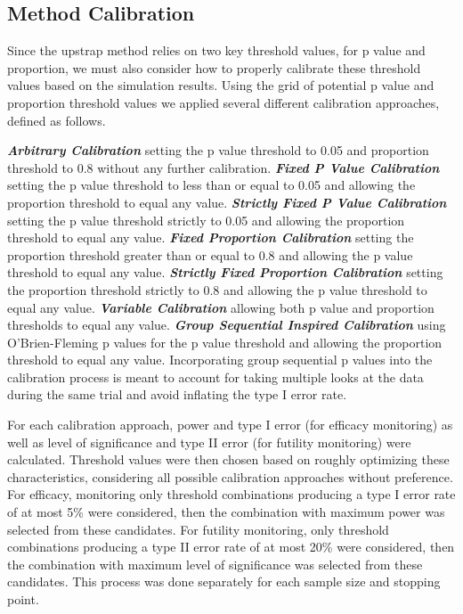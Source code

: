 \documentclass[Afour,sageh,times,square,numbers]{sagej}
\begin{document}
\subsection{Method Calibration}

Since the upstrap method relies on two key threshold values, for p value and proportion, we must also consider how to properly calibrate these threshold values based on the simulation results.  Using the grid of potential p value and proportion threshold values we applied several different calibration approaches, defined as follows.  

\textbf{\textit{Arbitrary Calibration}} setting the p value threshold to 0.05 and proportion threshold to 0.8 without any further calibration.  \textbf{\textit{Fixed P Value Calibration}} setting the p value threshold to less than or equal to 0.05 and allowing the proportion threshold to equal any value.  \textbf{\textit{Strictly Fixed P Value Calibration}} setting the p value threshold strictly to 0.05 and allowing the proportion threshold to equal any value.  \textbf{\textit{Fixed Proportion Calibration}} setting the proportion threshold greater than or equal to 0.8 and allowing the p value threshold to equal any value.  \textbf{\textit{Strictly Fixed Proportion Calibration}} setting the proportion threshold strictly to 0.8 and allowing the p value threshold to equal any value.  \textbf{\textit{Variable Calibration}} allowing both p value and proportion thresholds to equal any value.  \textbf{\textit{Group Sequential Inspired Calibration}} using O’Brien-Fleming p values for the p value threshold and allowing the proportion threshold to equal any value.  Incorporating group sequential p values into the calibration process is meant to account for taking multiple looks at the data during the same trial and avoid inflating the type I error rate.

For each calibration approach, power and type I error (for efficacy monitoring) as well as level of significance and type II error (for futility monitoring) were calculated.  Threshold values were then chosen based on roughly optimizing these characteristics, considering all possible calibration approaches without preference.  For efficacy, monitoring only threshold combinations producing a type I error rate of at most 5\% were considered, then the combination with maximum power was selected from these candidates.  For futility monitoring, only threshold combinations producing a type II error rate of at most 20\% were considered, then the combination with maximum level of significance was selected from these candidates.  This process was done separately for each sample size and stopping point.
\end{document}
